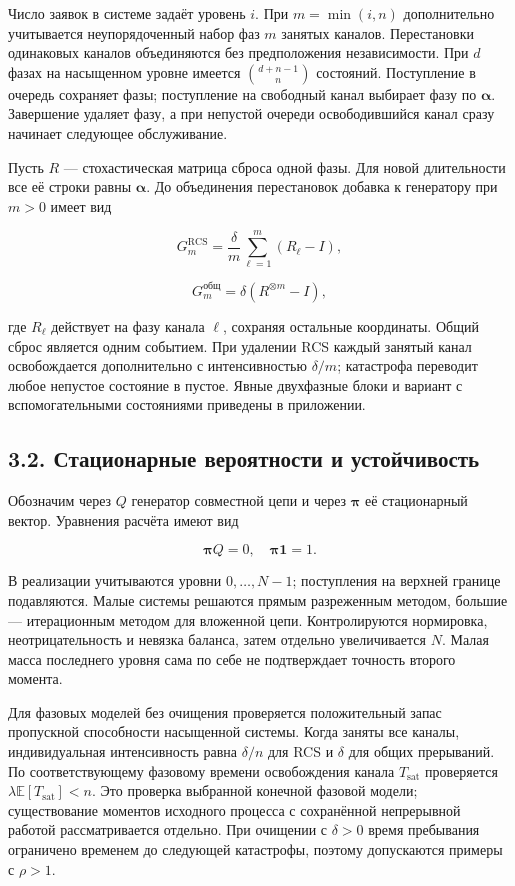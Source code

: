 Число заявок в системе задаёт уровень \(i\). При \(m=\min(i,n)\) дополнительно учитывается неупорядоченный набор фаз \(m\) занятых каналов. Перестановки одинаковых каналов объединяются без предположения независимости. При \(d\) фазах на насыщенном уровне имеется \(\binom{d+n-1}{n}\) состояний. Поступление в очередь сохраняет фазы; поступление на свободный канал выбирает фазу по \(\boldsymbol\alpha\). Завершение удаляет фазу, а при непустой очереди освободившийся канал сразу начинает следующее обслуживание.

Пусть \(R\) --- стохастическая матрица сброса одной фазы. Для новой длительности все её строки равны \(\boldsymbol\alpha\). До объединения перестановок добавка к генератору при \(m>0\) имеет вид


\[G_m^{\mathrm{RCS}}=\frac{\delta}{m}\sum_{\ell=1}^{m}(R_\ell-I),\]

\[G_m^{\text{общ}}=\delta(R^{\otimes m}-I),\]


где \(R_\ell\) действует на фазу канала \(\ell\), сохраняя остальные координаты. Общий сброс является одним событием. При удалении RCS каждый занятый канал освобождается дополнительно с интенсивностью \(\delta/m\); катастрофа переводит любое непустое состояние в пустое. Явные двухфазные блоки и вариант с вспомогательными состояниями приведены в приложении.

\subsection*{3.2. Стационарные вероятности и устойчивость}
Обозначим через \(Q\) генератор совместной цепи и через \(\boldsymbol\pi\) её стационарный вектор. Уравнения расчёта имеют вид


\[\boldsymbol\pi Q=0,\quad \boldsymbol\pi\mathbf1=1.\]


В реализации учитываются уровни \(0,\ldots,N-1\); поступления на верхней границе подавляются. Малые системы решаются прямым разреженным методом, большие --- итерационным методом для вложенной цепи. Контролируются нормировка, неотрицательность и невязка баланса, затем отдельно увеличивается \(N\). Малая масса последнего уровня сама по себе не подтверждает точность второго момента.

Для фазовых моделей без очищения проверяется положительный запас пропускной способности насыщенной системы. Когда заняты все каналы, индивидуальная интенсивность равна \(\delta/n\) для RCS и \(\delta\) для общих прерываний. По соответствующему фазовому времени освобождения канала \(T_{\mathrm{sat}}\) проверяется \(\lambda\mathbb E[T_{\mathrm{sat}}]<n\). Это проверка выбранной конечной фазовой модели; существование моментов исходного процесса с сохранённой непрерывной работой рассматривается отдельно. При очищении с \(\delta>0\) время пребывания ограничено временем до следующей катастрофы, поэтому допускаются примеры с \(\rho>1\).

